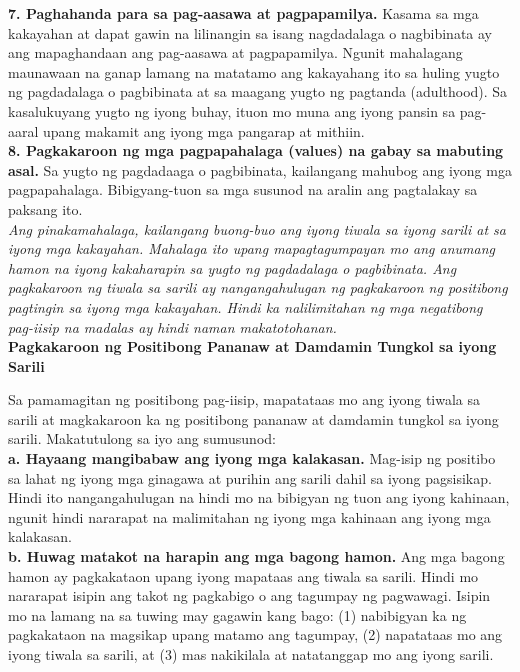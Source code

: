 \documentclass[10pt,a4paper]{article}
\newcommand{\NewsItem}[1]{%
		\usefont{T1}{augie}{m}{n} 	
		\large #1 \vspace{4pt}
		\par \normalsize \normalfont}
\begin{document}
\begin{multicols*}{3}
\textbf{7. Paghahanda para sa pag-aasawa at pagpapamilya.} Kasama sa mga kakayahan at dapat gawin na lilinangin sa isang nagdadalaga o nagbibinata ay ang mapaghandaan ang pag-aasawa at pagpapamilya. Ngunit mahalagang maunawaan na ganap lamang na matatamo ang kakayahang ito sa huling yugto ng pagdadalaga o pagbibinata at sa maagang yugto ng pagtanda (adulthood). Sa kasalukuyang yugto ng iyong buhay, ituon mo muna ang iyong pansin sa pag-aaral upang makamit ang iyong mga pangarap at mithiin.\\

\textbf{8. Pagkakaroon ng mga pagpapahalaga (values) na gabay sa mabuting asal.} Sa yugto ng pagdadaaga o pagbibinata, kailangang mahubog ang iyong mga pagpapahalaga. Bibigyang-tuon sa mga susunod na aralin ang pagtalakay sa paksang ito.\\

\textit{Ang pinakamahalaga, kailangang buong-buo ang iyong tiwala sa iyong sarili at sa iyong mga kakayahan. Mahalaga ito upang mapagtagumpayan mo ang anumang hamon na iyong kakaharapin sa yugto ng pagdadalaga o pagbibinata. Ang pagkakaroon ng tiwala sa sarili ay nangangahulugan ng pagkakaroon ng positibong pagtingin sa iyong mga kakayahan. Hindi ka nalilimitahan ng mga negatibong pag-iisip na madalas ay hindi naman makatotohanan.}\\


\NewsItem{\textbf{Pagkakaroon ng Positibong Pananaw at Damdamin Tungkol sa iyong Sarili}}

Sa pamamagitan ng positibong pag-iisip, mapatataas mo ang iyong tiwala sa sarili at magkakaroon ka ng positibong pananaw at damdamin tungkol sa iyong sarili. Makatutulong sa iyo ang sumusunod:\\

\textbf{a. Hayaang mangibabaw ang iyong mga kalakasan.} Mag-isip ng positibo sa lahat ng iyong mga ginagawa at purihin ang sarili dahil sa iyong pagsisikap. Hindi ito nangangahulugan na hindi mo na bibigyan ng tuon ang iyong kahinaan, ngunit hindi nararapat na malimitahan ng iyong mga kahinaan ang iyong mga kalakasan.\\

\textbf{b. Huwag matakot na harapin ang mga bagong hamon.} Ang mga bagong hamon ay pagkakataon upang iyong mapataas ang tiwala sa sarili. Hindi mo nararapat isipin ang takot ng pagkabigo o ang tagumpay ng pagwawagi. Isipin mo na lamang na sa tuwing may gagawin kang bago: (1) nabibigyan ka ng pagkakataon na magsikap upang matamo ang tagumpay, (2) napatataas mo ang iyong tiwala sa sarili, at (3) mas nakikilala at natatanggap mo ang iyong sarili.\\


\end{multicols*}
\end{document}
